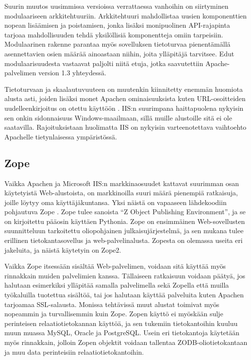 Suurin muutos uusimmissa versioissa verrattaessa vanhoihin on
siirtyminen modulaariseen arkkitehtuuriin. Arkkitehtuuri mahdollistaa uusien komponenttien nopean lisäämisen ja poistamisen, jonka lisäksi  
monipuolinen API-rajapinta tarjoaa mahdollisuuden tehdä yksilöllisiä komponentteja omiin tarpeisiin. Modulaarinen rakenne parantaa myös sovelluksen tietoturvaa pienentämällä asennettavien 
osien määrää ainoastaan niihin, joita ylläpitäjä tarvitsee. Edut modulaarisuudesta
vastaavat paljolti niitä etuja, jotka saavutettiin Apache-palvelimen version
1.3 yhteydessä.

Tietoturvaan ja skaalautuvuuteen on muutenkin kiinnitetty enemmän huomiota alusta asti, joiden lisäksi monet Apachen ominaisuuksista
kuten URL-osoitteiden uudelleenkirjoitus on otettu käyttöön \cite{IIS}. IIS:n suurimpana haittapuolena nykyisin sen onkin sidonnaisuus Windows-maailmaan, sillä muille alustoille sitä ei ole 
saatavilla. Rajoituksistaan huolimatta IIS on nykyisin varteenotettava vaihtoehto Apachelle tietynlaisessa ympäristössä. 

\subsection{Zope}

Vaikka Apachen ja Microsoft IIS:n markkinaosuudet kattavat suurimman osan käytetyistä Web-alustoista, on markkinoilla suuri määrä pienempiä ratkaisuja, joille löytyy oma käyttäjäkuntansa. Yksi 
näistä on vapaaseen lähdekoodiin pohjautuva Zope \cite{Zope}. Zope tulee sanoista ``Z Object Publishing Environment'', ja se on kirjoitettu pääosin käyttäen Pythonia. Zope on ensimmäinen
Web-sovellusten suunnitteluun tarkoitettu oliopohjainen julkaisujärjestelmä, ja sen mukana tulee erillinen tietokantasovellus ja web-palvelinalusta. Zopesta on olemassa useita eri jakeluita, ja 
näistä käytetyin on Zope2. 

Vaikka Zope itsessään sisältää Web-palvelimen, voidaan sitä käyttää myös rinnakkain muiden palvelimien kanssa. Tällaiseen ratkaisuun voidaan päätyä, jos halutaan esimerkiksi ylläpitää samalla
palvelimella sekä Zopella että muilla työkaluilla tuotettua sisältöä,
tai jos halutaan käyttää palveluita kuten Apachen tarjoamaa SSL-salausta. Monissa tehtävissä muut alustat toimivat myös nopeammin ja 
turvallisemmin kuin Zope. Zopen käyttö ei myöskään sulje perinteisen
relaatiotietokannan käyttöä, ja sen tukemiin tietokantoihin kuuluu
muun muassa MySQL, Oracle ja PostgreSQL. Usein eri 
tietokantoja käytetään myös rinnakkain, jolloin Zopen objektit voidaan tallentaa ZODB-oliotietokantaan ja muu data perinteisiin relaatiotietokantoihin. 

